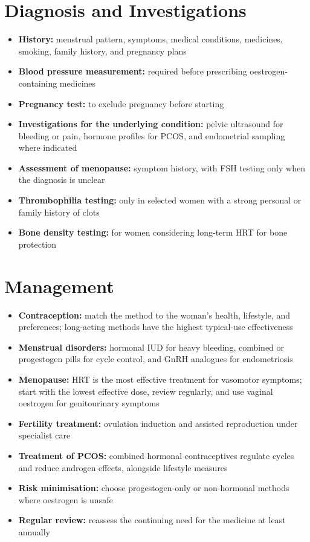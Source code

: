 \section*{Diagnosis and Investigations}
\begin{itemize}
    \item \textbf{History:} menstrual pattern, symptoms, medical conditions, medicines, smoking, family history, and pregnancy plans
    \item \textbf{Blood pressure measurement:} required before prescribing oestrogen-containing medicines
    \item \textbf{Pregnancy test:} to exclude pregnancy before starting
    \item \textbf{Investigations for the underlying condition:} pelvic ultrasound for bleeding or pain, hormone profiles for PCOS, and endometrial sampling where indicated
    \item \textbf{Assessment of menopause:} symptom history, with FSH testing only when the diagnosis is unclear
    \item \textbf{Thrombophilia testing:} only in selected women with a strong personal or family history of clots
    \item \textbf{Bone density testing:} for women considering long-term HRT for bone protection
\end{itemize}

\section*{Management}
\begin{itemize}
    \item \textbf{Contraception:} match the method to the woman's health, lifestyle, and preferences; long-acting methods have the highest typical-use effectiveness
    \item \textbf{Menstrual disorders:} hormonal IUD for heavy bleeding, combined or progestogen pills for cycle control, and GnRH analogues for endometriosis
    \item \textbf{Menopause:} HRT is the most effective treatment for vasomotor symptoms; start with the lowest effective dose, review regularly, and use vaginal oestrogen for genitourinary symptoms
    \item \textbf{Fertility treatment:} ovulation induction and assisted reproduction under specialist care
    \item \textbf{Treatment of PCOS:} combined hormonal contraceptives regulate cycles and reduce androgen effects, alongside lifestyle measures
    \item \textbf{Risk minimisation:} choose progestogen-only or non-hormonal methods where oestrogen is unsafe
    \item \textbf{Regular review:} reassess the continuing need for the medicine at least annually
\end{itemize}

